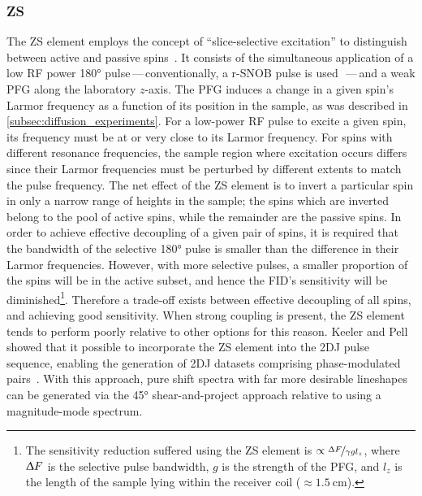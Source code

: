 \subsubsection{\ac{ZS}}
\label{subsec:ZS}
The \ac{ZS} element employs the concept of ``slice-selective excitation'' to
distinguish between active and passive spins~\cite{Zangger1997,Aguilar2010}. It
consists of the simultaneous application of a low \ac{RF} power \ang{180}
pulse\,---\,conventionally, a r-SNOB pulse is used~\cite{Kupce1995}\,---\,and a
weak \ac{PFG} along the laboratory $z$-axis.
The \ac{PFG} induces a change in a given spin's Larmor frequency as a
function of its position in the sample, as was described in
\cref{subsec:diffusion_experiments}. For a low-power \ac{RF} pulse to excite
a given spin, its frequency must be at or very close to its Larmor
frequency.
For spins with different resonance frequencies, the sample region where
excitation occurs differs since their Larmor frequencies must be perturbed by
different extents to match the pulse frequency.
The net effect of the \ac{ZS} element is to invert a particular spin in only a
narrow range of heights in the sample; the spins which are inverted belong to
the pool of active spins, while the remainder are the passive spins.
In order to achieve effective decoupling of a given pair of spins, it is required
that the bandwidth of the selective \ang{180} pulse is smaller than the
difference in their Larmor frequencies. However, with more selective pulses,
a smaller proportion of the spins will be in the active subset, and hence the
\ac{FID}'s sensitivity will be diminished\footnote{
    The sensitivity reduction suffered using the \ac{ZS} element is $\propto
    \nicefrac{\Updelta F}{\gamma g l_z}$, where $\Updelta F$ is the selective
    pulse bandwidth, $g$ is the strength of the \ac{PFG}, and $l_z$ is the
    length of the sample lying within the receiver coil ($\approx
    \qty{1.5}{\centi\meter}$).
}.
Therefore a trade-off exists between effective decoupling of all spins, and
achieving good sensitivity. When strong coupling is present,
the \ac{ZS} element tends to perform poorly relative to other options for this
reason. Keeler and Pell showed that it possible to incorporate the \ac{ZS}
element into the \ac{2DJ} pulse sequence, enabling the generation of \ac{2DJ}
datasets comprising phase-modulated pairs~\cite{Pell2007}. With this approach,
pure shift spectra with far more desirable lineshapes can be generated via the
\ang{45} shear-and-project approach relative to using a magnitude-mode
spectrum.

